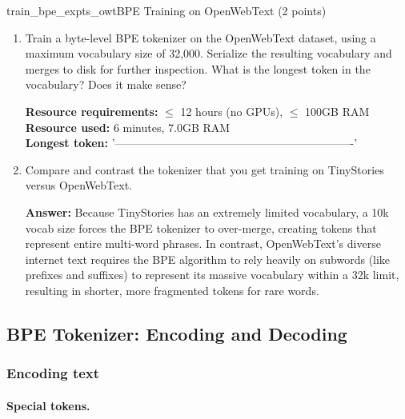 \begin{problembox}{train\_bpe\_expts\_owt}{BPE Training on OpenWebText (2 points)}

    \begin{enumerate}[label=(\alph*), itemsep=1em, topsep=0pt]

        \item Train a byte-level BPE tokenizer on the OpenWebText dataset, using a maximum vocabulary size of 32,000. Serialize the resulting vocabulary and merges to disk for further inspection. What is the longest token in the vocabulary? Does it make sense?

              \textbf{Resource requirements:} $\le$ 12 hours (no GPUs), $\le$ 100GB RAM \\
              \textbf{Resource used:} 6 minutes, 7.0GB RAM \\
              \textbf{Longest token:} '----------------------------------------------------------------'

        \item Compare and contrast the tokenizer that you get training on TinyStories versus OpenWebText.

              \textbf{Answer:} Because TinyStories has an extremely limited vocabulary, a 10k vocab size forces the BPE tokenizer to over-merge, creating tokens that represent entire multi-word phrases. In contrast, OpenWebText's diverse internet text requires the BPE algorithm to rely heavily on subwords (like prefixes and suffixes) to represent its massive vocabulary within a 32k limit, resulting in shorter, more fragmented tokens for rare words.

    \end{enumerate}

\end{problembox}

\subsection{BPE Tokenizer: Encoding and Decoding}

\subsubsection{Encoding text}

\paragraph{Special tokens.}


